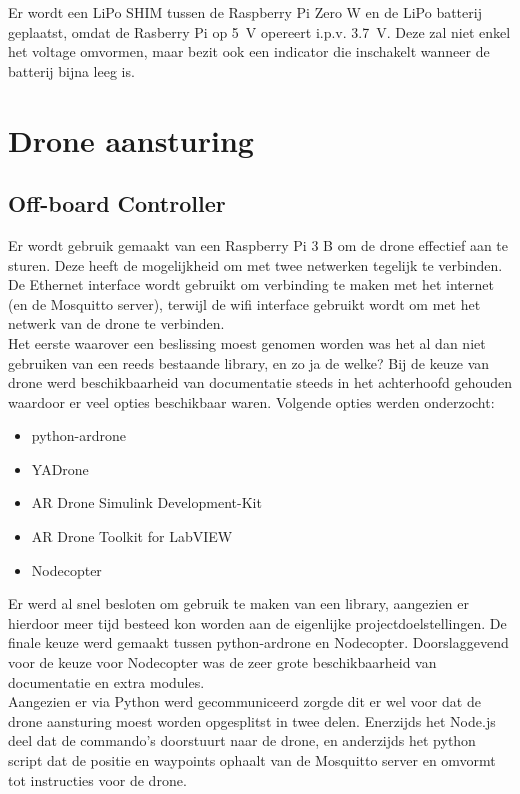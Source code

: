 Er wordt een LiPo SHIM tussen de Raspberry Pi Zero W en de LiPo batterij geplaatst, omdat de Rasberry Pi op \SI{5}{\V} opereert i.p.v. \SI{3.7}{\V}.
Deze zal niet enkel het voltage omvormen, maar bezit ook een indicator die inschakelt wanneer de batterij bijna leeg is.

\section{Drone aansturing} \label{sec:drone_control}
\subsection{Off-board Controller} \label{sec:offboard_controller}
Er wordt gebruik gemaakt van een Raspberry Pi 3 B om de drone effectief aan te sturen. Deze heeft de mogelijkheid om met twee netwerken tegelijk te verbinden. De Ethernet interface wordt gebruikt om verbinding te maken met het internet (en de Mosquitto server), terwijl de wifi interface gebruikt wordt om met het netwerk van de drone te verbinden.\\

Het eerste waarover een beslissing moest genomen worden was het al dan niet gebruiken van een reeds bestaande library, en zo ja de welke? Bij de keuze van drone werd beschikbaarheid van documentatie steeds in het achterhoofd gehouden waardoor er veel opties beschikbaar waren. Volgende opties werden onderzocht:
\begin{itemize}
\item python-ardrone
\item YADrone
\item AR Drone Simulink Development-Kit
\item AR Drone Toolkit for LabVIEW
\item Nodecopter
\end{itemize}

Er werd al snel besloten om gebruik te maken van een library, aangezien er hierdoor meer tijd besteed kon worden aan de eigenlijke projectdoelstellingen. De finale keuze werd gemaakt tussen python-ardrone en Nodecopter. Doorslaggevend voor de keuze voor Nodecopter was de zeer grote beschikbaarheid van documentatie en extra modules.\\

Aangezien er via Python werd gecommuniceerd zorgde dit er wel voor dat de drone aansturing moest worden opgesplitst in twee delen. Enerzijds het Node.js deel dat de commando's doorstuurt naar de drone, en anderzijds het python script dat de positie en waypoints ophaalt van de Mosquitto server en omvormt tot instructies voor de drone.

